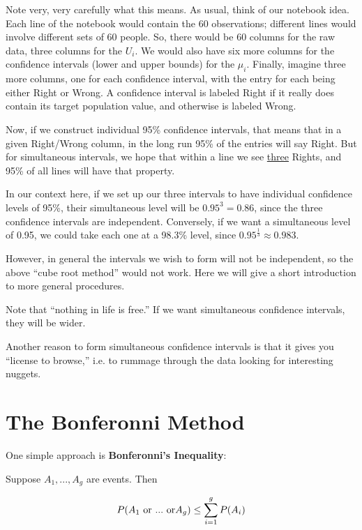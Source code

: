 Note very, very carefully what this means.  As usual, think of our
notebook idea.  Each line of the notebook would contain the 60
observations; different lines would involve different sets of 60 people.
So, there would be 60 columns for the raw data, three columns for the
$U_i$.  We would also have six more columns for the confidence intervals
(lower and upper bounds) for the $\mu_i$.  Finally, imagine three more
columns, one for each confidence interval, with the entry for each being
either Right or Wrong.  A confidence interval is labeled Right if it
really does contain its target population value, and otherwise is
labeled Wrong.

Now, if we construct individual 95\% confidence intervals, that means
that in a given Right/Wrong column, in the long run 95\% of the entries
will say Right.  But for simultaneous intervals, we hope that within a
line we see \underline{three} Rights, and 95\% of all lines will have
that property.

In our context here, if we set up our three intervals to have individual
confidence levels of 95\%, their simultaneous level will be $0.95^3 =
0.86$, since the three confidence intervals are independent.
Conversely, if we want a simultaneous level of 0.95, we could take each
one at a 98.3\% level, since $0.95^{\frac{1}{3}} \approx 0.983$.

However, in general the intervals we wish to form will not be
independent, so the above ``cube root method'' would not work.  Here we
will give a short introduction to more general procedures.

Note that ``nothing in life is free.''  If we want simultaneous
confidence intervals, they will be wider.

Another reason to form simultaneous confidence intervals is that it
gives you  ``license to browse,'' i.e. to rummage through the data
looking for interesting nuggets.

\section{The Bonferonni Method}

One simple approach is {\bf Bonferonni's Inequality}:

\begin{lemma}
Suppose $A_1,...,A_g$ are events.  Then

\begin{equation}
\label{bonf}
P(A_1 {\rm ~or~...~or} A_g) \leq \sum_{i=1}^{g} P(A_i)
\end{equation}

\end{lemma}

